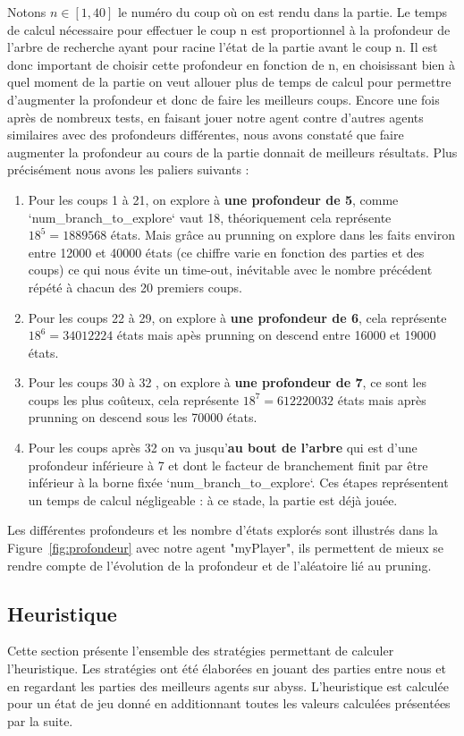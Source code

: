 \documentclass[a4paper,11pt,titlepage,leqno]{article}
\begin{document}
Notons $n \in [1, 40]$ le numéro du coup où on est rendu dans la partie.
Le temps de calcul nécessaire pour effectuer le coup n est proportionnel à la profondeur de l'arbre de recherche ayant pour racine l'état de la partie avant le coup n. 
Il est donc important de choisir cette profondeur en fonction de n, en choisissant bien à quel moment de la partie on veut allouer plus de temps de calcul pour permettre d'augmenter la profondeur et donc de faire les meilleurs coups. Encore une fois après de nombreux tests, en faisant jouer notre agent contre d'autres agents similaires avec des profondeurs différentes, nous avons constaté que faire augmenter la profondeur au cours de la partie donnait de meilleurs résultats. Plus précisément nous avons les paliers suivants :
\begin{enumerate}
    \item Pour les coups 1 à 21, on explore à \textbf{une profondeur de 5}, comme `num\_branch\_to\_explore` vaut 18, théoriquement cela représente $18^5 = 1889568$ états. Mais grâce au prunning on explore dans les faits environ entre 12000 et 40000  états (ce chiffre varie en fonction des parties et des coups) ce qui nous évite un time-out, inévitable avec le nombre précédent répété à chacun des 20 premiers coups.
    \item Pour les coups 22 à 29, on explore à \textbf{une profondeur de 6}, cela représente $18^6 = 34012224$ états mais apès prunning on descend entre 16000 et 19000 états.     
    \item Pour les coups 30 à 32 , on explore à \textbf{une profondeur de 7}, ce sont les coups les plus coûteux, cela représente $18^7 = 612220032$ états mais après prunning on descend sous les 70000 états.
    \item Pour les coups après 32 on va jusqu'\textbf{au bout de l'arbre} qui est d'une profondeur inférieure à 7 et dont le facteur de branchement finit par être inférieur à la borne fixée `num\_branch\_to\_explore`. Ces étapes représentent un temps de calcul négligeable : à ce stade, la partie est déjà jouée.
\end{enumerate}

Les différentes profondeurs et les nombre d'états explorés sont illustrés dans la Figure~\ref{fig:profondeur} avec notre agent "myPlayer", ils permettent de mieux se rendre compte de l'évolution de la profondeur et de l'aléatoire lié au pruning.


\subsection{Heuristique}
Cette section présente l'ensemble des stratégies permettant de calculer l'heuristique. Les stratégies ont été élaborées en jouant des parties entre nous et en regardant les parties des meilleurs agents sur abyss. L'heuristique est calculée pour un état de jeu donné en additionnant toutes les valeurs calculées présentées par la suite.
\end{document}
